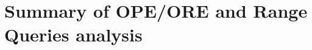 \chapter{Summary of OPE/ORE and Range Queries analysis}\label{appendix:ore-results}
\thispagestyle{myheadings}

	

	
